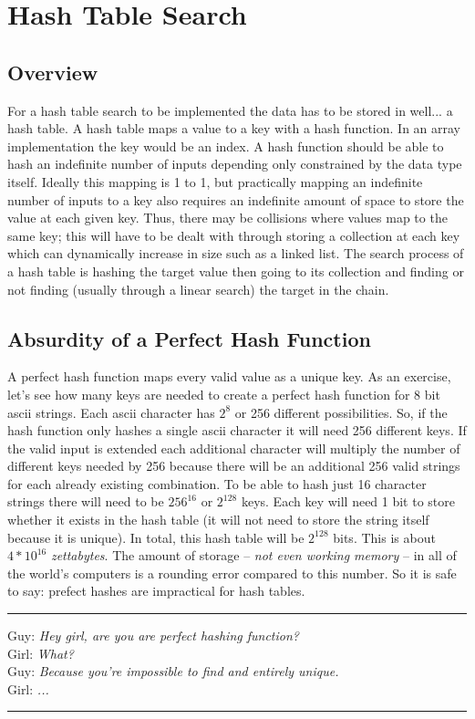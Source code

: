 \documentclass[letterpaper, 10pt]{article}
\begin{document}
\section{Hash Table Search}
\subsection{Overview}
For a hash table search to be implemented the data has to be stored in well... a hash table. A hash table maps
a value to a key with a hash function. In an array implementation the key would be an index. A hash function
should be able to hash an indefinite number of inputs depending only constrained by the data type itself. 
Ideally this mapping is 1 to 1, but practically mapping an indefinite number of inputs to a key also requires
an indefinite amount of space to store the value at each given key. Thus, there may be collisions
where values map to the same key; this will have to be dealt with through storing a collection at each key
which can dynamically increase in size such as a linked list. The search process of a hash table is
hashing the target value then going to its collection and finding or not finding (usually through a linear search)
the target in the chain.
\subsection{Absurdity of a Perfect Hash Function}
A perfect hash function maps every valid value as a unique key. As an exercise, let's see how many keys
are needed to create a perfect hash function for 8 bit ascii strings. Each ascii character
has $2^8$ or 256 different possibilities. So, if the hash function only hashes
a single ascii character it will need 256 different keys. If the valid input is extended each
additional character will multiply the number of different keys needed by 256 because there will be an
additional 256 valid strings for each already existing combination. To be able to hash just 16 character
strings there will need to be $256^{16}$ or $2^{128}$ keys. Each key will need 1 bit
to store whether it exists in
the hash table (it will not need to store the string itself because it is unique).
In total, this hash table will be $2^{128}$ bits. This is about $4*10^{16}$ \textit{zettabytes}. The amount
of storage -- \textit{not even working memory} -- in all of the world's computers is a rounding error compared to
this number. So it is safe to say: prefect hashes are impractical for hash tables.
\vspace{.25cm}
\hrule
\vspace{.25cm}
\noindent
Guy: \textit{Hey girl, are you are perfect hashing function?}\\
Girl: \textit{What?}\\
Guy: \textit{Because you're impossible to find and entirely unique.}\\
Girl: \textit{...}\\
\hrule
\vspace{1cm}
\newpage
\end{document}
